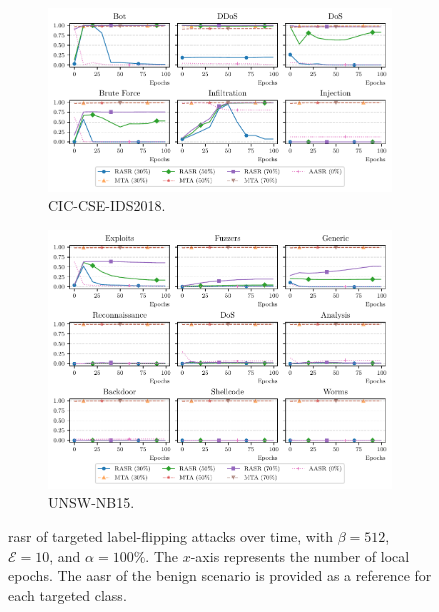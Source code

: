 \begin{figure}
  \centering
  \begin{subfigure}{\linewidth}
    \centering
    \includegraphics[width=\linewidth]{figures/cicids/backdoors}
    \caption{
      CIC-CSE-IDS2018.
      \label{fig:backdoors.cicids}
    }
  \end{subfigure}
  \begin{subfigure}{\linewidth}
    \centering
    \includegraphics[width=\linewidth]{figures/nb15/backdoors}
    \caption{
      UNSW-NB15.
      \label{fig:backdoors.nb15}
    }
  \end{subfigure}
  \caption[
    \Gls{rasr} of targeted label-flipping attacks over time.
  ]{
    \Gls{rasr} of targeted label-flipping attacks over time, with $\beta=512$, $\mathcal{E}=10$, and $\alpha=100\%$.
    The $x$-axis represents the number of local epochs.
    The \gls{aasr} of the benign scenario is provided as a reference for each targeted class.
    \label{fig:backdoors}
  }
\end{figure}

